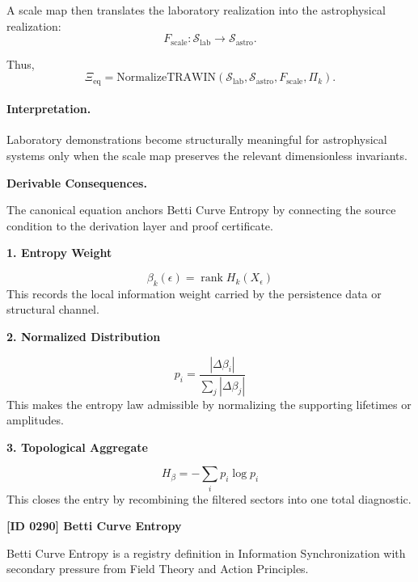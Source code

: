 A scale map then translates the laboratory realization into the astrophysical realization:
\begin{equation}
F_{\mathrm{scale}}:
\mathcal{S}_{\mathrm{lab}}
\to
\mathcal{S}_{\mathrm{astro}} .
\end{equation}

Thus,
\begin{equation}
\boxed{
\Xi_{\mathrm{eq}}
=
\mathrm{NormalizeTRAWIN}
\left(
\mathcal{S}_{\mathrm{lab}},
\mathcal{S}_{\mathrm{astro}},
F_{\mathrm{scale}},
\Pi_k
\right).
}
\end{equation}

\paragraph{Interpretation.}
Laboratory demonstrations become structurally meaningful for astrophysical systems only when the scale map preserves the relevant dimensionless invariants.

\par\vspace{0.35em}
\noindent\textbf{Derivable Consequences.}\quad
\begingroup
\footnotesize
\raggedright
The canonical equation anchors Betti Curve Entropy by connecting the source condition to the derivation layer and proof certificate.
\par\endgroup

\noindent\textbf{1. Entropy Weight}\par
\[
\beta_k(\epsilon)=\operatorname{rank}H_k(X_{\epsilon})
\]
\noindent This records the local information weight carried by the persistence data or structural channel.\par
\noindent\textbf{2. Normalized Distribution}\par
\[
p_i=\frac{|\Delta\beta_i|}{\sum_j|\Delta\beta_j|}
\]
\noindent This makes the entropy law admissible by normalizing the supporting lifetimes or amplitudes.\par
\noindent\textbf{3. Topological Aggregate}\par
\[
H_{\beta}=-\sum_i p_i\log p_i
\]
\noindent This closes the entry by recombining the filtered sectors into one total diagnostic.\par

\clearpage
\noindent\textbf{[ID 0290] Betti Curve Entropy}\par
\vspace{0.35em}
\begingroup\small
{}
Betti Curve Entropy is a registry definition in Information Synchronization with secondary pressure from Field Theory and Action Principles.

